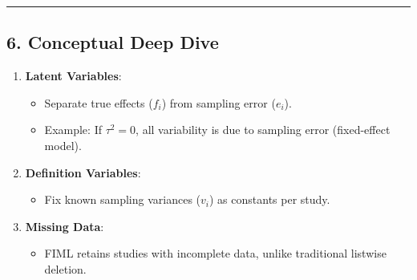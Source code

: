 \documentclass[
  letterpaper,
  DIV=11,
  numbers=noendperiod]{scrartcl}
\providecommand{\tightlist}{%
  \setlength{\itemsep}{0pt}\setlength{\parskip}{0pt}}\usepackage{longtable,booktabs,array}
\begin{document}
\begin{center}\rule{0.5\linewidth}{0.5pt}\end{center}

\subsection*{\texorpdfstring{6. \textbf{Conceptual Deep
Dive}}{6. Conceptual Deep Dive}}\label{conceptual-deep-dive}

\begin{tcolorbox}[enhanced jigsaw, toptitle=1mm, colframe=quarto-callout-tip-color-frame, left=2mm, colbacktitle=quarto-callout-tip-color!10!white, opacitybacktitle=0.6, bottomtitle=1mm, bottomrule=.15mm, coltitle=black, titlerule=0mm, title=\textcolor{quarto-callout-tip-color}{\faLightbulb}\hspace{0.5em}{Why SEM for Meta-Analysis?}, opacityback=0, toprule=.15mm, rightrule=.15mm, colback=white, breakable, arc=.35mm, leftrule=.75mm]

\begin{enumerate}
\def\labelenumi{\arabic{enumi}.}
\tightlist
\item
  \textbf{Latent Variables}:

  \begin{itemize}
  \tightlist
  \item
    Separate true effects (\(f_i\)) from sampling error (\(e_i\)).\\
  \item
    Example: If \(\tau^2 = 0\), all variability is due to sampling error
    (fixed-effect model).
  \end{itemize}
\item
  \textbf{Definition Variables}:

  \begin{itemize}
  \tightlist
  \item
    Fix known sampling variances (\(v_i\)) as constants per study.
  \end{itemize}
\item
  \textbf{Missing Data}:

  \begin{itemize}
  \tightlist
  \item
    FIML retains studies with incomplete data, unlike traditional
    listwise deletion.\\
  \end{itemize}
\end{enumerate}

\end{tcolorbox}
\end{document}
